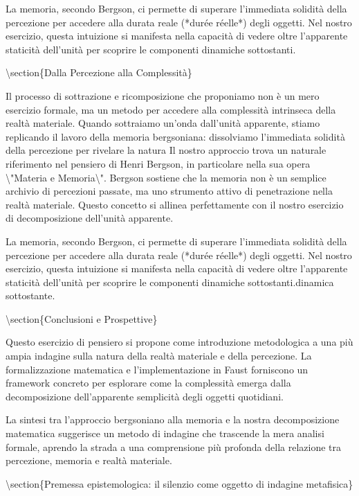 \documentclass[a4paper,11pt]{article}
\begin{document}
La memoria, secondo Bergson, ci permette di superare l'immediata
solidit\`a della percezione per accedere alla durata reale (*dur\'ee
r\'eelle*) degli oggetti. Nel nostro esercizio, questa intuizione si
manifesta nella capacit\`a di vedere oltre l'apparente staticit\`a
dell'unit\`a per scoprire le componenti dinamiche sottostanti.

\textbackslash{}section\{Dalla Percezione alla Complessit\`a\}

Il processo di sottrazione e ricomposizione che proponiamo non \`e un mero
esercizio formale, ma un metodo per accedere alla complessit\`a intrinseca
della realt\`a materiale. Quando sottraiamo un'onda dall'unit\`a apparente,
stiamo replicando il lavoro della memoria bergsoniana: dissolviamo
l'immediata solidit\`a della percezione per rivelare la natura Il nostro approccio trova un naturale riferimento nel pensiero di Henri
Bergson, in particolare nella sua opera \textbackslash{}"Materia e Memoria\textbackslash{}". Bergson
sostiene che la memoria non \`e un semplice archivio di percezioni
passate, ma uno strumento attivo di penetrazione nella realt\`a materiale.
Questo concetto si allinea perfettamente con il nostro esercizio di
decomposizione dell'unit\`a apparente.

La memoria, secondo Bergson, ci permette di superare l'immediata
solidit\`a della percezione per accedere alla durata reale (*dur\'ee
r\'eelle*) degli oggetti. Nel nostro esercizio, questa intuizione si
manifesta nella capacit\`a di vedere oltre l'apparente staticit\`a
dell'unit\`a per scoprire le componenti dinamiche sottostanti.dinamica
sottostante.

\textbackslash{}section\{Conclusioni e Prospettive\}

Questo esercizio di pensiero si propone come introduzione metodologica a
una pi\`u ampia indagine sulla natura della realt\`a materiale e della
percezione. La formalizzazione matematica e l'implementazione in Faust
forniscono un framework concreto per esplorare come la complessit\`a
emerga dalla decomposizione dell'apparente semplicit\`a degli oggetti
quotidiani.

La sintesi tra l'approccio bergsoniano alla memoria e la nostra
decomposizione matematica suggerisce un metodo di indagine che trascende
la mera analisi formale, aprendo la strada a una comprensione pi\`u
profonda della relazione tra percezione, memoria e realt\`a materiale.

\textbackslash{}section\{Premessa epistemologica: il silenzio come oggetto di indagine metafisica\}
\end{document}
